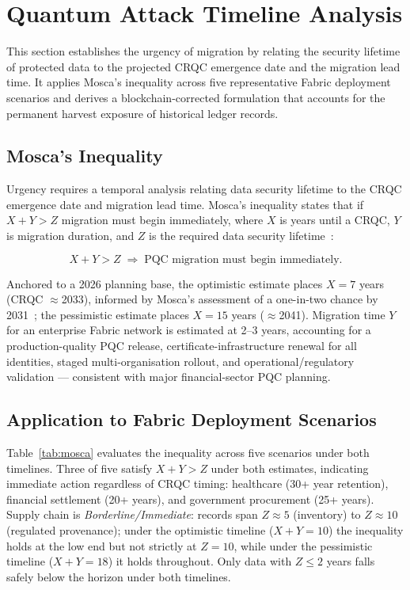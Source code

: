 \documentclass[conference]{IEEEtran}
\begin{document}
\section{Quantum Attack Timeline Analysis}
\label{sec:tm_mosca}
This section establishes the urgency of migration by relating the security lifetime of protected data to the projected CRQC emergence date and the migration lead time. It applies Mosca's inequality across five representative Fabric deployment scenarios and derives a blockchain-corrected formulation that accounts for the permanent harvest exposure of historical ledger records.

\subsection{Mosca's Inequality}
Urgency requires a temporal analysis relating data security lifetime to the CRQC
emergence date and migration lead time. Mosca's inequality states that if
$X+Y>Z$ migration must begin immediately, where $X$ is years until a CRQC, $Y$ is
migration duration, and $Z$ is the required data security
lifetime~\cite{mosca2018}:

\begin{equation}
X + Y > Z \;\Longrightarrow\; \text{PQC migration must begin immediately.}
\label{eq:mosca}
\end{equation}

Anchored to a 2026 planning base, the optimistic estimate places $X=7$ years
(CRQC $\approx$2033), informed by Mosca's assessment of a one-in-two chance by
2031~\cite{mosca2018}; the pessimistic estimate places $X=15$ years
($\approx$2041). Migration time $Y$ for an enterprise Fabric network is estimated
at 2--3 years, accounting for a production-quality PQC release,
certificate-infrastructure renewal for all identities, staged multi-organisation
rollout, and operational/regulatory validation --- consistent with major
financial-sector PQC planning.

\subsection{Application to Fabric Deployment Scenarios}

Table~\ref{tab:mosca} evaluates the inequality across five scenarios under both
timelines. Three of five satisfy $X+Y>Z$ under both estimates, indicating
immediate action regardless of CRQC timing: healthcare (30+ year retention),
financial settlement (20+ years), and government procurement (25+ years). Supply
chain is \textit{Borderline/Immediate}: records span $Z\!\approx\!5$ (inventory)
to $Z\!\approx\!10$ (regulated provenance); under the optimistic timeline
($X+Y=10$) the inequality holds at the low end but not strictly at $Z=10$, while
under the pessimistic timeline ($X+Y=18$) it holds throughout. Only data with
$Z\le 2$ years falls safely below the horizon under both timelines.
\end{document}
